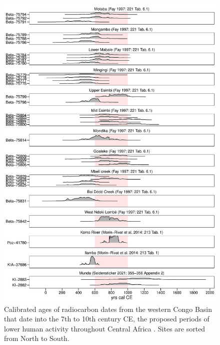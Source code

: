 \begin{reviewer}
\begin{figure}[p]
	\centering
	\includegraphics[width=.9\textwidth]{output/rev_fig_c14_wCB_hiatus.pdf}
	\caption{Calibrated ages of radiocarbon dates from the western Congo Basin \citep[region E in][Fig. 1]{Seidensticker.2021} that date into the 7th to 10th century CE, the proposed periods of lower human activity throughout Central Africa \citep{Seidensticker.2021}. Sites are sorted from North to South.}
	\label{fig:rev_fig_c14_wCB_hiatus}
\end{figure}


\end{reviewer}
